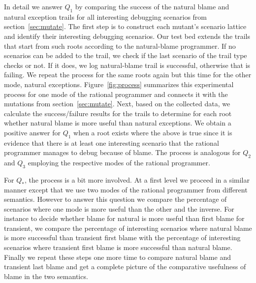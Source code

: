 
In detail we answer $Q_1$  by comparing the success of the 
natural blame and natural exception trails for all interesting 
debugging scenarios from section~\ref{sec:mutate}.
  The first step is to construct each
mutant's scenario lattice and identify their interesting debugging
scenarios.
Our test
bed extends the trails that start from such roots according to the natural-blame programmer.  If no scenarios
can be added to the trail, we check if
the last scenario of the trail type checks or not. If it does, we log natural-blame
trail is successful, otherwise that is failing. We repeat the process for the
same roots again but this time for the other mode, natural exceptions.
 Figure~\ref{fig:process}
summarizes this
experimental process for one mode of the rational programmer and connects
it with the mutations from section~\ref{sec:mutate}.
Next, based on the collected data, we calculate the
success/failure results for the trails to determine for each root whether natural blame
is more useful than natural exceptions. We
obtain a positive answer for
$Q_1$ when a root exists where the above is true since it is evidence that
there is at least one interesting scenario that the rational programmer
manages to debug because of blame. 
The process is analogous for $Q_2$ and $Q_3$  employing the respective
modes of the rational programmer.

For $Q_*$, the process is a bit more
involved. At a first level we proceed in a similar
manner except that we use two modes 
of the rational programmer from different semantics.
However to answer this question we compare the percentage of scenarios
where one mode is more useful than the other and the inverse.
For instance to
decide whether blame for natural is more useful than first blame for transient, 
we compare the percentage of interesting scenarios where 
natural blame is more successful than transient first blame 
with the percentage of interesting scenarios where transient first blame 
is more successful than natural blame. 
Finally we repeat these steps one more time to compare natural blame and transient last blame
and get a complete picture of the comparative usefulness of blame
in the two semantics.

